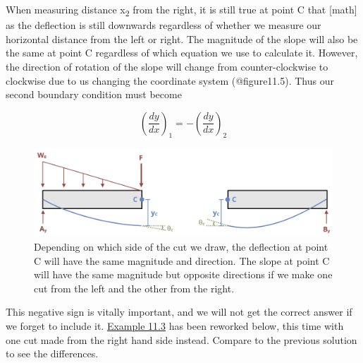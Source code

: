 \documentclass[
  letterpaper,
  DIV=11,
  numbers=noendperiod]{scrreprt}
\begin{document}
When measuring distance x\textsubscript{2} from the right, it is still
true at point C that {[}math{]} as the deflection is still downwards
regardless of whether we measure our horizontal distance from the left
or right. The magnitude of the slope will also be the same at point C
regardless of which equation we use to calculate it. However, the
direction of rotation of the slope will change from counter-clockwise to
clockwise due to us changing the coordinate system (@figure11.5). Thus
our second boundary condition must become

\[
\left(\frac{d y}{d x}\right)_{1}=-\left(\frac{d y}{d x}\right)_{2}
\]

\begin{figure}

{\centering \includegraphics{images/CH11 PNGs/11.5.png}

}

\caption{Depending on which side of the cut we draw, the deflection at
point C will have the same magnitude and direction. The slope at point C
will have the same magnitude but opposite directions if we make one cut
from the left and the other from the right.}

\end{figure}%

This negative sign is vitally important, and we will not get the correct
answer if we forget to include it. \hyperref[example-11.3b]{Example
11.3} has been reworked below, this time with one cut made from the
right hand side instead. Compare to the previous solution to see the
differences.
\end{document}
